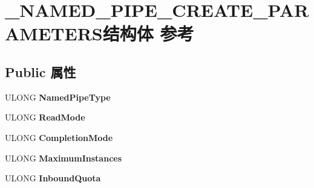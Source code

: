 \hypertarget{struct___n_a_m_e_d___p_i_p_e___c_r_e_a_t_e___p_a_r_a_m_e_t_e_r_s}{}\section{\+\_\+\+N\+A\+M\+E\+D\+\_\+\+P\+I\+P\+E\+\_\+\+C\+R\+E\+A\+T\+E\+\_\+\+P\+A\+R\+A\+M\+E\+T\+E\+R\+S结构体 参考}
\label{struct___n_a_m_e_d___p_i_p_e___c_r_e_a_t_e___p_a_r_a_m_e_t_e_r_s}
\subsection*{Public 属性}
\begin{DoxyCompactItemize}
\item 
\mbox{\label{struct___n_a_m_e_d___p_i_p_e___c_r_e_a_t_e___p_a_r_a_m_e_t_e_r_s_aef433a18ba62c8dbb462be9ebeba7605}} 
U\+L\+O\+NG {\bfseries Named\+Pipe\+Type}
\item 
\mbox{\label{struct___n_a_m_e_d___p_i_p_e___c_r_e_a_t_e___p_a_r_a_m_e_t_e_r_s_a8e7c63ee17b54922b886dc151c756498}} 
U\+L\+O\+NG {\bfseries Read\+Mode}
\item 
\mbox{\label{struct___n_a_m_e_d___p_i_p_e___c_r_e_a_t_e___p_a_r_a_m_e_t_e_r_s_a7b33791f939207c669cf7e054b9b4fe2}} 
U\+L\+O\+NG {\bfseries Completion\+Mode}
\item 
\mbox{\label{struct___n_a_m_e_d___p_i_p_e___c_r_e_a_t_e___p_a_r_a_m_e_t_e_r_s_a8ce0733c65a6fefba37340c3d3ce4ea1}} 
U\+L\+O\+NG {\bfseries Maximum\+Instances}
\item 
\mbox{\label{struct___n_a_m_e_d___p_i_p_e___c_r_e_a_t_e___p_a_r_a_m_e_t_e_r_s_adb26d1696c931208aa4fd502c3a5a9e2}} 
U\+L\+O\+NG {\bfseries Inbound\+Quota}
\item 
\mbox{\label{struct___n_a_m_e_d___p_i_p_e___c_r_e_a_t_e___p_a_r_a_m_e_t_e_r_s_a30ac7bdf4ae1f48639b5dbcbd78f4e5a}} 

\end{DoxyCompactItemize}
